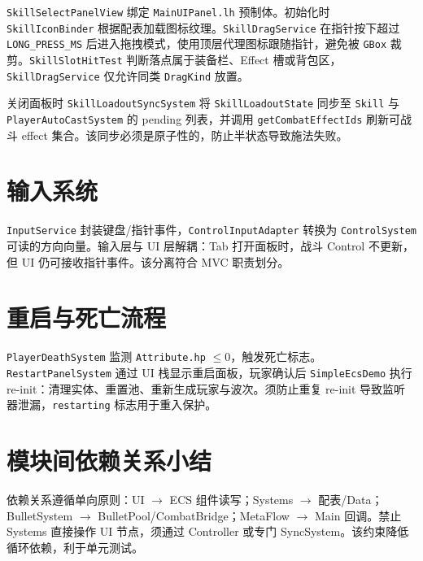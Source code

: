 \texttt{SkillSelectPanelView} 绑定 \texttt{MainUIPanel.lh} 预制体。初始化时 \texttt{SkillIconBinder} 根据配表加载图标纹理。\texttt{SkillDragService} 在指针按下超过 \texttt{LONG\_PRESS\_MS} 后进入拖拽模式，使用顶层代理图标跟随指针，避免被 \texttt{GBox} 裁剪。\texttt{SkillSlotHitTest} 判断落点属于装备栏、Effect 槽或背包区，\texttt{SkillDragService} 仅允许同类 \texttt{DragKind} 放置。

关闭面板时 \texttt{SkillLoadoutSyncSystem} 将 \texttt{SkillLoadoutState} 同步至 \texttt{Skill} 与 \texttt{PlayerAutoCastSystem} 的 pending 列表，并调用 \texttt{getCombatEffectIds} 刷新可战斗 effect 集合。该同步必须是原子性的，防止半状态导致施法失败。

\section{输入系统}

\texttt{InputService} 封装键盘/指针事件，\texttt{ControlInputAdapter} 转换为 \texttt{ControlSystem} 可读的方向向量。输入层与 UI 层解耦：Tab 打开面板时，战斗 Control 不更新，但 UI 仍可接收指针事件。该分离符合 MVC 职责划分\cite{heijstek2011empirical}。

\section{重启与死亡流程}

\texttt{PlayerDeathSystem} 监测 \texttt{Attribute.hp} $\leq 0$，触发死亡标志。\texttt{RestartPanelSystem} 通过 UI 栈显示重启面板，玩家确认后 \texttt{SimpleEcsDemo} 执行 re-init：清理实体、重置池、重新生成玩家与波次。须防止重复 re-init 导致监听器泄漏，\texttt{restarting} 标志用于重入保护。

\section{模块间依赖关系小结}

依赖关系遵循单向原则：UI $\rightarrow$ ECS 组件读写；Systems $\rightarrow$ 配表/Data；BulletSystem $\rightarrow$ BulletPool/CombatBridge；MetaFlow $\rightarrow$ Main 回调。禁止 Systems 直接操作 UI 节点，须通过 Controller 或专门 SyncSystem。该约束降低循环依赖，利于单元测试\cite{petty2010vv}。
